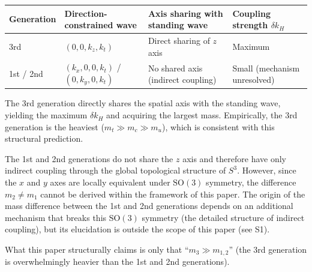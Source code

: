 \documentclass[
  a4paper,11pt]{article}
\newcounter{none}
\theoremstyle{definition}
\theoremstyle{remark}
\begin{document}
{\def\LTcaptype{none} %
\begin{longtable}[]{@{}
  >{\raggedright\arraybackslash}p{}
  >{\raggedright\arraybackslash}p{}
  >{\raggedright\arraybackslash}p{}
  >{\raggedright\arraybackslash}p{}@{}}
\toprule\noalign{}
\begin{minipage}[b]{\linewidth}\raggedright
Generation
\end{minipage} & \begin{minipage}[b]{\linewidth}\raggedright
Direction-constrained wave
\end{minipage} & \begin{minipage}[b]{\linewidth}\raggedright
Axis sharing with standing wave
\end{minipage} & \begin{minipage}[b]{\linewidth}\raggedright
Coupling strength \(\delta k_H\)
\end{minipage} \\
\midrule\noalign{}
\endhead
\bottomrule\noalign{}
\endlastfoot
3rd & \((0, 0, k_z, k_t)\) & Direct sharing of \(z\) axis & Maximum \\
1st / 2nd & \((k_x, 0, 0, k_t)\) / \((0, k_y, 0, k_t)\) & No shared axis
(indirect coupling) & Small (mechanism unresolved) \\
\end{longtable}
}

The 3rd generation directly shares the spatial axis with the standing
wave, yielding the maximum \(\delta k_H\) and acquiring the largest
mass. Empirically, the 3rd generation is the heaviest
(\(m_t \gg m_c \gg m_u\)), which is consistent with this structural
prediction.

The 1st and 2nd generations do not share the \(z\) axis and therefore
have only indirect coupling through the global topological structure of
\(S^3\). However, since the \(x\) and \(y\) axes are locally equivalent
under \(\mathrm{SO}(3)\) symmetry, the difference \(m_2 \neq m_1\)
cannot be derived within the framework of this paper. The origin of the
mass difference between the 1st and 2nd generations depends on an
additional mechanism that breaks this \(\mathrm{SO}(3)\) symmetry (the
detailed structure of indirect coupling), but its elucidation is outside
the scope of this paper (see S1).

What this paper structurally claims is only that ``\(m_3 \gg m_{1,2}\)''
(the 3rd generation is overwhelmingly heavier than the 1st and 2nd
generations).
\end{document}
